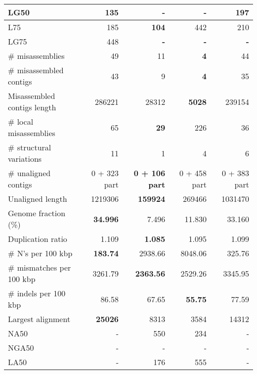 \documentclass[12pt,a4paper]{article}
\begin{document}
\begin{table}[ht]
\begin{center}
\begin{tabular}{|l*{4}{|r}|}
LG50 & 135 & {\bf -} & {\bf -} & 197 \\ \hline
L75 & 185 & {\bf 104} & 442 & 210 \\ \hline
LG75 & 448 & {\bf -} & {\bf -} & {\bf -} \\ \hline
\# misassemblies & 49 & 11 & {\bf 4} & 44 \\ \hline
\# misassembled contigs & 43 & 9 & {\bf 4} & 35 \\ \hline
Misassembled contigs length & 286221 & 28312 & {\bf 5028} & 239154 \\ \hline
\# local misassemblies & 65 & {\bf 29} & 226 & 36 \\ \hline
\# structural variations & 11 & 1 & 4 & 6 \\ \hline
\# unaligned contigs & 0 + 323 part & {\bf 0 + 106 part} & 0 + 458 part & 0 + 383 part \\ \hline
Unaligned length & 1219306 & {\bf 159924} & 269466 & 1031470 \\ \hline
Genome fraction (\%) & {\bf 34.996} & 7.496 & 11.830 & 33.160 \\ \hline
Duplication ratio & 1.109 & {\bf 1.085} & 1.095 & 1.099 \\ \hline
\# N's per 100 kbp & {\bf 183.74} & 2938.66 & 8048.06 & 325.76 \\ \hline
\# mismatches per 100 kbp & 3261.79 & {\bf 2363.56} & 2529.26 & 3345.95 \\ \hline
\# indels per 100 kbp & 86.58 & 67.65 & {\bf 55.75} & 77.59 \\ \hline
Largest alignment & {\bf 25026} & 8313 & 3584 & 14312 \\ \hline
NA50 & - & 550 & 234 & - \\ \hline
NGA50 & - & - & - & - \\ \hline
LA50 & - & 176 & 555 & - \\ \hline
\end{tabular}
\end{center}
\end{table}
\end{document}
